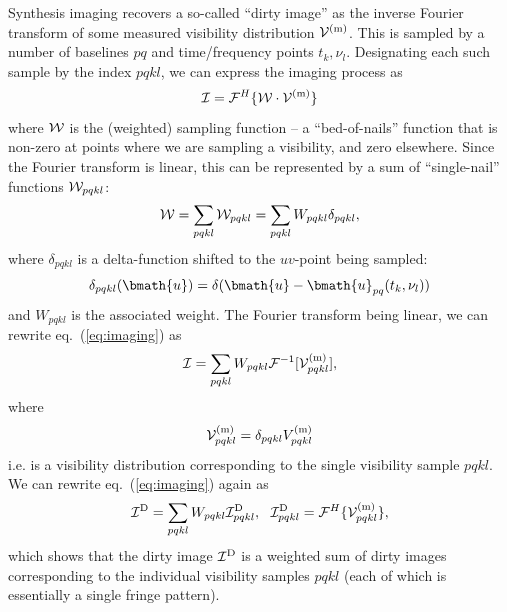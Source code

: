 \documentclass[useAMS,usenatbib]{mn2e}
\begin{document}
Synthesis imaging recovers a so-called ``dirty image'' as the inverse Fourier transform of some measured  
visibility distribution $\mathcal{V}^\mathrm{(m)}$. This is sampled by a number of baselines $pq$ and time/frequency points 
$t_k,\nu_l$. Designating each such sample by the index $pqkl$, we can express the imaging process as
\begin{equation}
\label{eq:imaging}
\mathcal{I} = \mathcal{F}^H\{ \mathcal{W}\cdot \mathcal{V}^\mathrm{(m)} \}  
\end{equation}
where $\mathcal{W}$ is the (weighted) sampling function -- a ``bed-of-nails'' function that is non-zero at points where we 
are sampling a visibility, and zero elsewhere. 
Since the Fourier transform is linear, this can be represented by a sum of  ``single-nail'' functions $\mathcal{W}_{pqkl}$:
\begin{equation}
\mathcal{W} = \sum_{pqkl} \mathcal{W}_{pqkl} = \sum_{pqkl} W_{pqkl} \delta_{pqkl},
\end{equation}
where $\delta_{pqkl}$ is a delta-function shifted to the $uv$-point being sampled:
\begin{equation}
\delta_{pqkl}(\bmath{u}) = \delta(\bmath{u}-\bmath{u}_{pq}(t_k,\nu_l))
\end{equation}
and $W_{pqkl}$ is the 
associated weight. The Fourier transform being linear, we can rewrite eq.~(\ref{eq:imaging}) as 
\begin{equation}
\label{eq:imaging2}
\mathcal{I} = \sum_{pqkl} W_{pqkl} \mathcal{F}^{-1}[ \mathcal{V}^\mathrm{(m)}_{pqkl} ],
\end{equation}
where 
\begin{equation}
\label{eq:imaging2a}
\mathcal{V}^\mathrm{(m)}_{pqkl} = \delta_{pqkl} V^\mathrm{(m)}_{pqkl}
\end{equation}
i.e. is a visibility distribution corresponding to the single visibility sample $pqkl$. We can rewrite eq.~(\ref{eq:imaging})
again as
\begin{equation}
\label{eq:imaging3}
\mathcal{I}^\mathrm{D} =  \sum_{pqkl} W_{pqkl} \mathcal{I}^\mathrm{D}_{pqkl},~~
\mathcal{I}^\mathrm{D}_{pqkl} =  \mathcal{F}^H\{ \mathcal{V}^\mathrm{(m)}_{pqkl} \},
\end{equation}
which shows that the dirty image $\mathcal{I}^\mathrm{D}$ is a weighted sum of dirty images corresponding to the individual visibility 
samples $pqkl$ (each of which is essentially a single fringe pattern).
\end{document}
